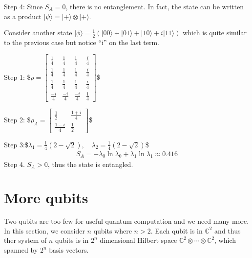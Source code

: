 \documentclass[letterpaper,10pt,english]{jupyterBook}
\begin{document}
\sphinxAtStartPar
Step 4:  Since \(S_A=0\), there is no entanglement.  In fact, the state can be written as a product \(|\psi\rangle = |+\rangle \otimes |+\rangle\).

\sphinxAtStartPar
Consider another state \(|\phi \rangle = \frac{1}{2}\left(|00\rangle + |01\rangle + |10\rangle + i |11\rangle \right)\) which is quite similar to the previous case but notice “i” on the last term.

\sphinxAtStartPar
Step 1:
\$\(
\rho = \begin{bmatrix} \frac{1}{4} & \frac{1}{4} & \frac{1}{4} & \frac{i}{4} \\ \frac{1}{4} & \frac{1}{4} & \frac{1}{4} & \frac{i}{4} \\ \frac{1}{4} & \frac{1}{4} & \frac{1}{4} & \frac{i}{4} \\ \frac{-i}{4} & \frac{-i}{4} & \frac{-i}{4} & \frac{1}{4} \end{bmatrix}
\)\$

\sphinxAtStartPar
Step 2:
\$\(
\rho_A = \begin{bmatrix} \frac{1}{2} & \frac{1+i}{4} \\ \frac{1-i}{4} & \frac{1}{2} \end{bmatrix}
\)\$

\sphinxAtStartPar
Step 3:\$\(
\lambda_1 = \frac{1}{4}\left(2-\sqrt{2}\right), \quad \lambda_2=\frac{1}{4}\left(2-\sqrt{2}\right)
\)\$
\begin{equation*}
\begin{split}
S_A = - \lambda_0 \ln \lambda_0 + \lambda_1 \ln \lambda_1 \approx 0.416
\end{split}
\end{equation*}
\sphinxAtStartPar
Step 4.
\(S_A > 0\), thus the state is entangled.

\sphinxstepscope


\section{More qubits}
\label{\detokenize{composites/morequbits:more-qubits}}\label{\detokenize{composites/morequbits:sec-more-qubits}}\label{\detokenize{composites/morequbits::doc}}
\sphinxAtStartPar
Two qubits are too few for useful quantum computation and we need many more. In this section, we consider \(n\) qubits where \(n>2\).  Each qubit is in \(\mathbb{C}^2\) and thus  ther system of \(n\) qubits is in \(2^n\) dimensional Hilbert space \(\mathbb{C}^2 \otimes \cdots \otimes \mathbb{C}^2\), which spanned by \(2^n\) basis vectors.
\end{document}

